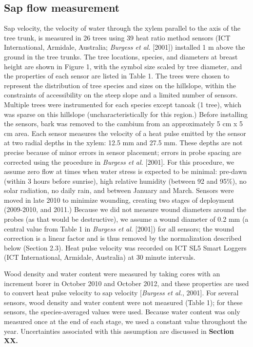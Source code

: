 \subsection{Sap flow measurement}
Sap velocity, the velocity of water through the xylem parallel to the axis of the tree trunk, is measured in 26 trees using 39 heat ratio method sensors (ICT International, Armidale, Australia; \textit{Burgess et al.} [2001]) installed 1 m above the ground in the tree trunks.  The tree locations, species, and diameters at breast height are shown in Figure 1, with the symbol size scaled by tree diameter, and the properties of each sensor are listed in Table 1.  The trees were chosen to represent the distribution of tree species and sizes on the hillslope, within the constraints of accessibility on the steep slope and a limited number of sensors.  Multiple trees were instrumented for each species except tanoak (1 tree), which was sparse on this hillslope (uncharacteristically for this region.)  Before installing the sensors, bark was removed to the cambium from an approximately 5 cm x 5 cm area.  Each sensor measures the velocity of a heat pulse emitted by the sensor at two radial depths in the xylem: 12.5 mm and 27.5 mm.  These depths are not precise because of minor errors in sensor placement; errors in probe spacing are corrected using the procedure in \textit{Burgess et al.} [2001].  For this procedure, we assume zero flow at times when water stress is expected to be minimal: pre-dawn (within 3 hours before sunrise), high relative humidity (between 92 and 95\%), no solar radiation, no daily rain, and between January and March.  Sensors were moved in late 2010 to minimize wounding, creating two stages of deployment (2009-2010, and 2011.)  Because we did not measure wound diameters around the probes (as that would be destructive), we assume a wound diameter of 0.2 mm (a central value from Table 1 in \textit{Burgess et al.} [2001]) for all sensors; the wound correction is a linear factor and is thus removed by the normalization described below (Section 2.3).  Heat pulse velocity was recorded on ICT SL5 Smart Loggers (ICT International, Armidale, Australia) at 30 minute intervals.

Wood density and water content were measured by taking cores with an increment borer in October 2010 and October 2012, and these properties are used to convert heat pulse velocity to sap velocity [\textit{Burgess et al.}, 2001].  For several sensors, wood density and water content were not measured (Table 1); for these sensors, the species-averaged values were used.  Because water content was only measured once at the end of each stage, we used a constant value throughout the year.  Uncertainties associated with this assumption are discussed in \textbf{Section XX.}

